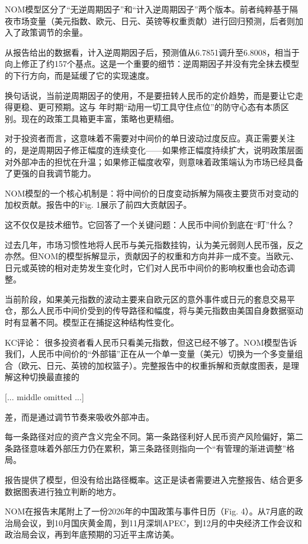 \documentclass[11pt]{ctexart}
\begin{document}
NOM模型区分了“无逆周期因子”和“计入逆周期因子”两个版本。前者纯粹基于隔夜市场变量（美元指数、欧元、日元、英镑等权重贡献）进行回归预测，后者则加入了政策调节的余量。

从报告给出的数据看，计入逆周期因子后，预测值从6.7851调升至6.8008，相当于向上修正了约157个基点。这是一个重要的细节：逆周期因子并没有完全抹去模型的下行方向，而是延缓了它的实现速度。

换句话说，当前逆周期因子的使用，不是要扭转人民币的定价趋势，而是要让它走得更稳、更可预期。这与 年时期“动用一切工具守住点位”的防守心态有本质区别。现在的政策工具箱更丰富，策略也更精细。

对于投资者而言，这意味着不需要对中间价的单日波动过度反应。真正需要关注的，是逆周期因子修正幅度的连续变化——如果修正幅度持续扩大，说明政策层面对外部冲击的担忧在升温；如果修正幅度收窄，则意味着政策端认为市场已经具备了更强的自我调节能力。

NOM模型的一个核心机制是：将中间价的日度变动拆解为隔夜主要货币对变动的加权贡献。报告中的Fig. 1展示了前四大贡献因子。

这不仅仅是技术细节。它回答了一个关键问题：人民币中间价到底在“盯”什么？

过去几年，市场习惯性地将人民币与美元指数挂钩，认为美元弱则人民币强，反之亦然。但NOM的模型拆解显示，贡献因子的权重和方向并非一成不变。当欧元、日元或英镑的相对走势发生变化时，它们对人民币中间价的影响权重也会动态调整。

当前阶段，如果美元指数的波动主要来自欧元区的意外事件或日元的套息交易平仓，那么人民币中间价受到的传导路径和幅度，将与美元指数由美国自身数据驱动时有显著不同。模型正在捕捉这种结构性变化。

KC评论： 很多投资者看人民币只看美元指数，但这已经不够了。NOM模型告诉我们，人民币中间价的“外部锚”正在从一个单一变量（美元）切换为一个多变量组合（欧元、日元、英镑的加权篮子）。完整报告中的权重拆解和贡献度图表，是理解这种切换最直接的

[... middle omitted ...]

差，而是通过调节节奏来吸收外部冲击。

每一条路径对应的资产含义完全不同。第一条路径利好人民币资产风险偏好，第二条路径意味着外部压力仍在累积，第三条路径则指向一个“有管理的渐进调整”格局。

报告提供了模型，但没有给出路径概率。这正是读者需要进入完整报告、结合更多数据图表进行独立判断的地方。

NOM在报告末尾附上了一份2026年的中国政策与事件日历（Fig. 4）。从7月底的政治局会议，到10月国庆黄金周，到11月深圳APEC，到12月的中央经济工作会议和政治局会议，再到年底预期的习近平主席访美。
\end{document}
